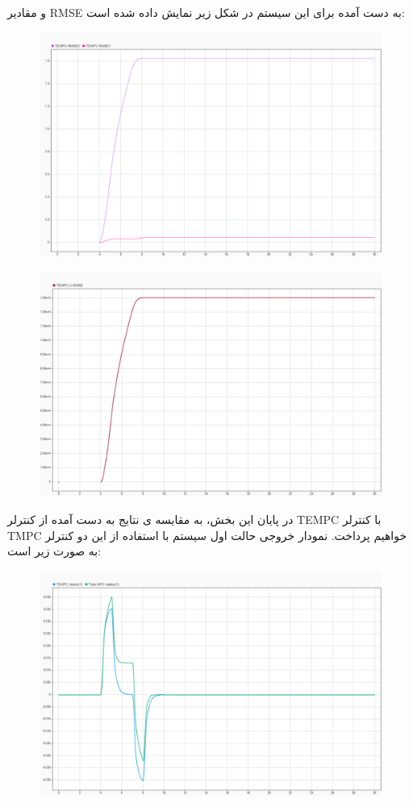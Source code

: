 و مقادیر RMSE به دست آمده برای این سیستم در شکل زیر نمایش داده شده است:
\begin{figure}[H]
	\centering
	\includegraphics[width=0.7\linewidth]{../img/39}
	\caption{}
	\label{fig:39}
\end{figure}
\begin{figure}[H]
	\centering
	\includegraphics[width=0.7\linewidth]{../img/40}
	\caption{}
	\label{fig:40}
\end{figure}

در پایان این بخش، به مقایسه ی نتایج به دست آمده از کنترلر TEMPC با کنترلر TMPC خواهیم پرداخت.
نمودار خروجی حالت اول سیستم با استفاده از این دو کنترلر به صورت زیر است:
\begin{figure}[H]
	\centering
	\includegraphics[width=0.7\linewidth]{../img/41}
	\caption{}
	\label{fig:41}
\end{figure}


